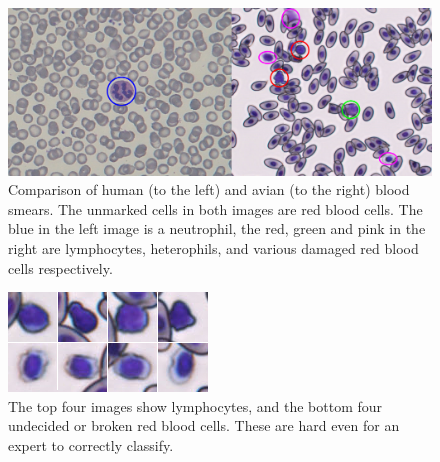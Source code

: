 \begin{figure}[h!]
    \centering
    \includegraphics[width=\textwidth]{comparison_marked}
    \caption{Comparison of human (to the left) and avian (to the right) blood smears. The unmarked cells in both images are red blood cells. The blue in the left image is a neutrophil, the red, green and pink in the right are lymphocytes,  heterophils, and various damaged red blood cells respectively.}
    \label{fig:comparison}
\end{figure}

\begin{figure}[h!]
    \centering
    \includegraphics[width=\textwidth/2]{comparison_sneaky_}
    \caption{The top four images show lymphocytes, and the bottom four undecided or broken red blood cells. These are hard even for an expert to correctly classify.}
    \label{fig:sneaky}
\end{figure}
